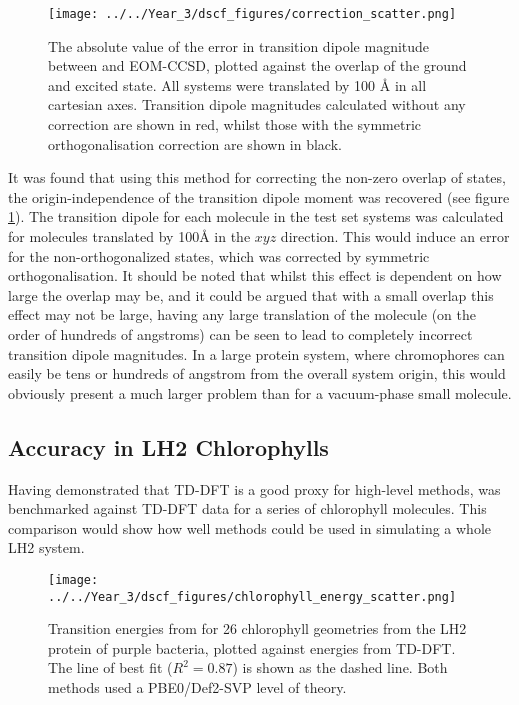 \begin{figure}
\centering
\texttt{[image: ../../Year\_3/dscf\_figures/correction\_scatter.png]}
\caption{The absolute value of the error in transition dipole magnitude between
\dscf and EOM-CCSD, plotted against the \dscf overlap of the ground and excited
state. All systems were translated by 100 \AA{} in all cartesian axes. Transition
dipole magnitudes calculated without any correction are shown in red, whilst
those with the symmetric orthogonalisation correction are shown in black.}
\label{fig:correction_scatter}
\end{figure}

It was found that using this method for correcting the non-zero overlap of states, 
the origin-independence of the transition dipole moment was recovered (see figure
\ref{fig:correction_scatter}).
The transition dipole for each molecule in the test set systems was calculated
for molecules translated by 100\AA{} in the $xyz$ direction.
This would induce an error for the non-orthogonalized states, which was corrected 
by symmetric orthogonalisation. It should be noted that whilst this effect is dependent
on how large the overlap may be, and it could be argued that with a small overlap 
this effect may not be large, having any large translation of the molecule (on the order of hundreds of angstroms) 
can be seen to lead to completely incorrect transition dipole magnitudes. In a
large protein system, where chromophores can easily be tens or hundreds of angstrom
from the overall system origin, this would obviously present a much larger problem 
than for a vacuum-phase small molecule.

\subsection{\dscf Accuracy in LH2 Chlorophylls}
\label{subsec:dscf_chl_tests}
Having demonstrated that TD-DFT is a good proxy for high-level methods, \dscf was
benchmarked against TD-DFT data for a series of chlorophyll molecules. This comparison 
would show how well \dscf methods could be used in simulating a whole LH2 system.

\begin{figure}
\centering
\texttt{[image: ../../Year\_3/dscf\_figures/chlorophyll\_energy\_scatter.png]}
\caption{Transition energies from \dscf for 26 chlorophyll geometries from the LH2
protein of purple bacteria,  plotted against energies from TD-DFT. The line of
best fit ($R^2=0.87$) is shown as the dashed line. Both methods used a PBE0/Def2-SVP 
level of theory.}
\label{fig:chl_energy}
\end{figure}

